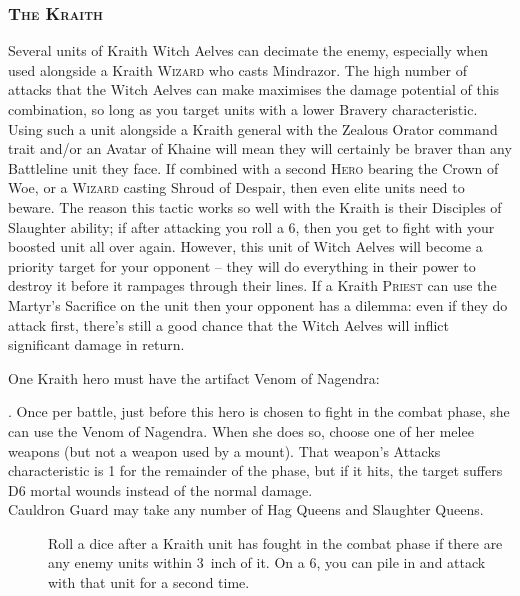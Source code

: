 \subsubsection{\textsc{The Kraith}} 
Several units of Kraith Witch Aelves can decimate the enemy, especially when
used alongside a Kraith \textsc{Wizard} who casts Mindrazor. The high number of
attacks that the Witch Aelves can make maximises the damage potential of this
combination, so long as you target units with a lower Bravery characteristic.
Using such a unit alongside a Kraith general with the Zealous Orator command
trait and/or an Avatar of Khaine will mean they will certainly be braver than
any Battleline unit they face. If combined with a second \textsc{Hero} bearing
the Crown of Woe, or a \textsc{Wizard} casting Shroud of Despair, then even
elite units need to beware. The reason this tactic works so well with the
Kraith is their Disciples of Slaughter ability; if after attacking you roll
a 6, then you get to fight with your boosted unit all over again. However, this
unit of Witch Aelves will become a priority target for your opponent – they
will do everything in their power to destroy it before it rampages through
their lines. If a Kraith \textsc{Priest} can use the Martyr’s Sacrifice on the
unit then your opponent has a dilemma: even if they do attack first, there’s
still a good chance that the Witch Aelves will inflict significant damage in
return.

One Kraith hero must have the artifact Venom of Nagendra:\\

\textbf{}.  
Once per battle, just before this hero is chosen to fight in the combat phase,
she can use the Venom of Nagendra. When she does so, choose one of her melee
weapons (but not a weapon used by a mount). That weapon's Attacks
characteristic is 1 for the remainder of the phase, but if it hits, the target
suffers D6 mortal wounds instead of the normal damage.\\ 
Cauldron Guard may take any number of Hag Queens and Slaughter Queens. 
\begin{description}
    \item [] Roll
        a dice after a Kraith unit has fought in the combat phase if there are
        any enemy units within 3~inch of it. On a 6, you can pile in and attack
        with that unit for a second time.
\end{description}

